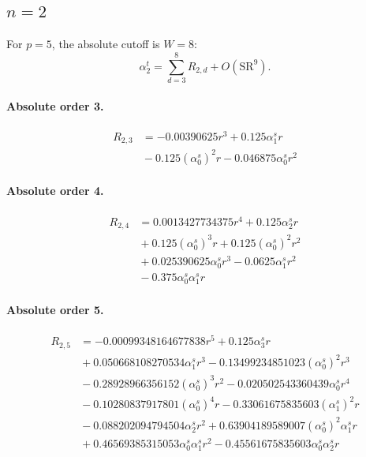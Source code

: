 \documentclass[10pt]{article}
\begin{document}
\subsection{$n=2$}
For $p=5$, the absolute cutoff is $W=8$:
\[\alpha_{2}^t=\sum_{d=3}^{8}R_{2,d}+O(\mathrm{SR}^{9}).\]
\paragraph{Absolute order 3.}
\begin{align*}
R_{2,3} &=  - 0.00390625 r^{3} + 0.125 \alpha_{1}^s r \\
&{}  - 0.125 \left(\alpha_{0}^s\right)^{2} r - 0.046875 \alpha_{0}^s r^{2}
\end{align*}

\paragraph{Absolute order 4.}
\begin{align*}
R_{2,4} &= 0.0013427734375 r^{4} + 0.125 \alpha_{2}^s r \\
&{}  + 0.125 \left(\alpha_{0}^s\right)^{3} r + 0.125 \left(\alpha_{0}^s\right)^{2} r^{2} \\
&{}  + 0.025390625 \alpha_{0}^s r^{3} - 0.0625 \alpha_{1}^s r^{2} \\
&{}  - 0.375 \alpha_{0}^s \alpha_{1}^s r
\end{align*}

\paragraph{Absolute order 5.}
\begin{align*}
R_{2,5} &=  - 0.00099348164677838 r^{5} + 0.125 \alpha_{3}^s r \\
&{}  + 0.050668108270534 \alpha_{1}^s r^{3} - 0.13499234851023 \left(\alpha_{0}^s\right)^{2} r^{3} \\
&{}  - 0.28928966356152 \left(\alpha_{0}^s\right)^{3} r^{2} - 0.020502543360439 \alpha_{0}^s r^{4} \\
&{}  - 0.10280837917801 \left(\alpha_{0}^s\right)^{4} r - 0.33061675835603 \left(\alpha_{1}^s\right)^{2} r \\
&{}  - 0.088202094794504 \alpha_{2}^s r^{2} + 0.63904189589007 \left(\alpha_{0}^s\right)^{2} \alpha_{1}^s r \\
&{}  + 0.46569385315053 \alpha_{0}^s \alpha_{1}^s r^{2} - 0.45561675835603 \alpha_{0}^s \alpha_{2}^s r
\end{align*}
\end{document}
